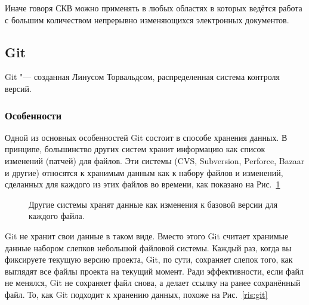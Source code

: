 \documentclass{article}
\begin{document}
			Иначе говоря СКВ можно применять в любых областях в которых ведётся работа с большим количеством непрерывно 					изменяющихся электронных документов.
		\subsection{Git}
			Git "--- созданная Линусом Торвальдсом, распределенная система контроля версий.
			\subsubsection{Особенности}
				Одной из основных особенностей Git состоит в способе хранения данных. В принципе, большинство других систем 					хранит 	информацию как список изменений (патчей) для файлов. Эти системы (CVS, Subversion, Perforce, Bazaar и другие) 			относятся к хранимым данным как к набору файлов и изменений, сделанных для каждого из этих файлов во времени, как 					показано на Рис.~\ref{ris:other-scv}
			
			\begin{figure}[h!]
				\caption{Другие системы хранят данные как изменения к базовой версии для каждого файла.}
				\label{ris:other-scv}
			\end{figure}	
			\newpage
				Git не хранит свои данные в таком виде. Вместо этого Git считает хранимые данные набором слепков небольшой 						файловой системы. Каждый раз, когда вы фиксируете текущую версию проекта, Git, по сути, сохраняет слепок того, как 					выглядят все файлы проекта на текущий момент. Ради эффективности, если файл не менялся, Git не сохраняет файл снова, 				а делает ссылку на ранее сохранённый файл. То, как Git подходит к хранению данных, похоже на Рис.~\ref{ris:git}
			
\end{document}
